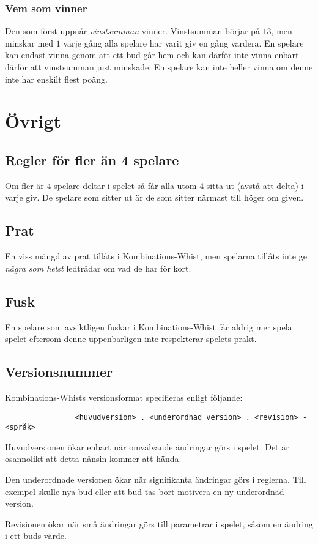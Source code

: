 \documentclass[a4paper]{article}
\begin{document}
{{			\subsubsection{Vem som vinner}{%
				Den som först uppnår \emph{vinstsumman} vinner. Vinstsumman börjar på $13$, men minskar med $1$ varje gång alla spelare har varit giv en gång vardera. En spelare kan endast vinna genom att ett bud går hem och kan därför inte vinna enbart därför att vinstsumman just minskade. En spelare kan inte heller vinna om denne inte har enskilt flest poäng.
			}
		}
	}

	\section{Övrigt}{%
		\subsection{Regler för fler än 4 spelare}{%
			Om fler är $4$ spelare deltar i spelet så får alla utom $4$ sitta ut (avstå att delta) i varje giv. De spelare som sitter ut är de som sitter närmast till höger om given.
			
			
		}
		
		\subsection{Prat}{%
			En viss mängd av prat tillåts i Kombinations-Whist, men spelarna tillåts inte ge \emph{några som helst} ledtrådar om vad de har för kort.
		}
		
		\subsection{Fusk}{%
			En spelare som avsiktligen fuskar i Kombinations-Whist får aldrig mer spela spelet eftersom denne uppenbarligen inte respekterar spelets prakt.
		}

		\subsection{Versionsnummer}{%
			Kombinations-Whists versionsformat specifieras enligt följande:

			\begin{verbatim}
				<huvudversion> . <underordnad version> . <revision> - <språk>
			\end{verbatim}

			Huvudversionen ökar enbart när omvälvande ändringar görs i spelet. Det är osannolikt att detta nånsin kommer att hända.

			Den underordnade versionen ökar när signifikanta ändringar görs i reglerna. Till exempel skulle nya bud eller att bud tas bort motivera en ny underordnad version.

			Revisionen ökar när små ändringar görs till parametrar i spelet, såsom en ändring i ett buds värde.
		}
	}

	\pagebreak
	
	
\end{document}
